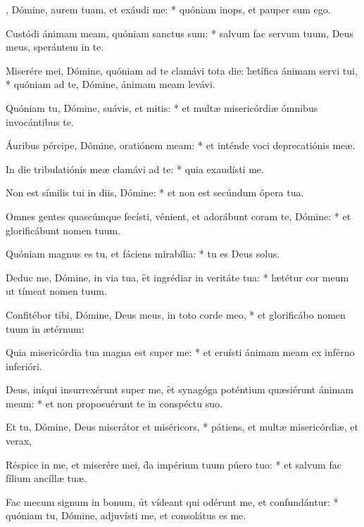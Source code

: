 \begin{psalmus}

    , Dómine, aurem tuam, et exáudi me: * quóniam inops, et pauper sum ego.

    Custódi ánimam meam, quóniam sanctus sum: * salvum fac servum tuum, Deus meus, sperántem in te.

    Miserére mei, Dómine, quóniam ad te clamávi tota die: \f lætífica ánimam servi tui, * quóniam ad te, Dómine, ánimam meam levávi.

    Quóniam tu, Dómine, suávis, et mitis: * et multæ misericórdiæ ómnibus invocántibus te.

    Áuribus pércipe, Dómine, oratiónem meam: * et inténde voci deprecatiónis meæ.

    In die tribulatiónis meæ clamávi ad te: * quia exaudísti me.

    Non est símilis tui in diis, Dómine: * et non est secúndum ópera tua.

    Omnes gentes quascúmque fecísti, vénient, et adorábunt coram te, Dómine: * et glorificábunt nomen tuum.

    Quóniam magnus es tu, et fáciens mirabília: * tu es Deus solus.

    Deduc me, Dómine, in via tua, \f et ingrédiar in veritáte tua: * lætétur cor meum ut tímeat nomen tuum.

    Confitébor tibi, Dómine, Deus meus, in toto corde meo, * et glorificábo nomen tuum in ætérnum:

    Quia misericórdia tua magna est super me: * et eruísti ánimam meam ex inférno inferióri.

    Deus, iníqui insurrexérunt super me, \f et synagóga poténtium quæsiérunt ánimam meam: * et non proposuérunt te in conspéctu suo.

    Et tu, Dómine, Deus miserátor et miséricors, * pátiens, et multæ misericórdiæ, et verax,

    Réspice in me, et miserére mei, \f da impérium tuum púero tuo: * et salvum fac fílium ancíllæ tuæ.

    Fac mecum signum in bonum, \f ut vídeant qui odérunt me, et confundántur: * quóniam tu, Dómine, adjuvísti me, et consolátus es me.

\end{psalmus}
